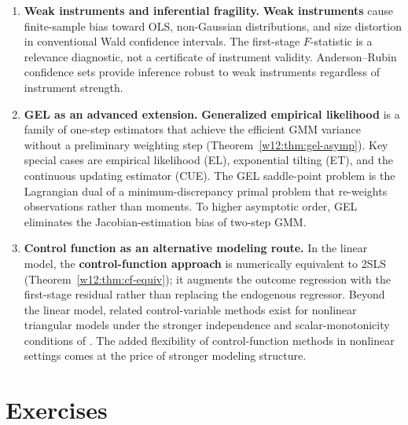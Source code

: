 \documentclass[master.tex]{subfiles}
\begin{document}
\begin{enumerate}
  \item \textbf{Weak instruments and inferential fragility.}
    \textbf{Weak instruments} cause finite-sample bias toward OLS,
    non-Gaussian distributions, and size distortion in conventional
    Wald confidence intervals.  The first-stage $F$-statistic is a
    relevance diagnostic, not a certificate of instrument validity.
    Anderson--Rubin confidence sets provide inference robust to
    weak instruments regardless of instrument strength.

  \item \textbf{GEL as an advanced extension.}
    \textbf{Generalized empirical likelihood} is a family of one-step
    estimators that achieve the efficient GMM variance without a
    preliminary weighting step (Theorem~\ref{w12:thm:gel-asymp}).
    Key special cases are empirical likelihood (EL), exponential
    tilting (ET), and the continuous updating estimator (CUE).  The
    GEL saddle-point problem is the Lagrangian dual of a
    minimum-discrepancy primal problem that re-weights observations
    rather than moments.  To higher asymptotic order, GEL eliminates
    the Jacobian-estimation bias of two-step GMM.

  \item \textbf{Control function as an alternative modeling route.}
    In the linear model, the \textbf{control-function approach} is
    numerically equivalent to 2SLS
    (Theorem~\ref{w12:thm:cf-equiv}); it augments the outcome
    regression with the first-stage residual rather than replacing
    the endogenous regressor.  Beyond the linear model, related
    control-variable methods exist for nonlinear triangular models
    under the stronger independence and scalar-monotonicity
    conditions of \citet{imbens2009}.  The added flexibility of
    control-function methods in nonlinear settings comes at the price
    of stronger modeling structure.
\end{enumerate}

\section*{Exercises}
\label{w12:sec:exercises}
\end{document}
